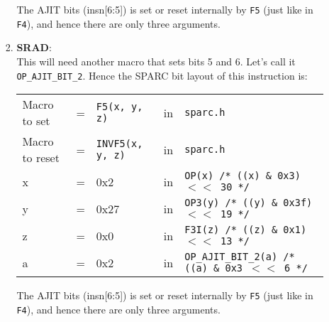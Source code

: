 \begin{itemize}
\begin{enumerate}
\begin{enumerate}
      The AJIT bits (insn[6:5]) is  set or reset internally by \texttt{F5}
      (just  like  in  \texttt{F4}),  and   hence  there  are  only  three
      arguments.

    \item \textbf{SRAD}:\\
      This will need another macro that sets bits 5 and 6. Let's call it
      \texttt{OP\_AJIT\_BIT\_2}.   Hence the  SPARC bit  layout of  this
      instruction is:

      \begin{tabular}[h]{lclcl}
        Macro to set  &=& \texttt{F5(x, y, z)} &in& \texttt{sparc.h}     \\
        Macro to reset  &=& \texttt{INVF5(x, y, z)} &in& \texttt{sparc.h}     \\
        x &=& 0x2      &in& \texttt{OP(x)  /* ((x) \& 0x3)  $<<$ 30 */} \\
        y &=& 0x27     &in& \texttt{OP3(y) /* ((y) \& 0x3f) $<<$ 19 */} \\
        z &=& 0x0      &in& \texttt{F3I(z) /* ((z) \& 0x1)  $<<$ 13 */} \\
        a &=& 0x2      &in& \texttt{OP\_AJIT\_BIT\_2(a) /* ((a) \& 0x3  $<<$ 6 */}
      \end{tabular}

      The AJIT bits (insn[6:5]) is  set or reset internally by \texttt{F5}
      (just  like  in  \texttt{F4}),  and   hence  there  are  only  three
      arguments.
    \end{enumerate}
  \end{enumerate}
\end{itemize}

